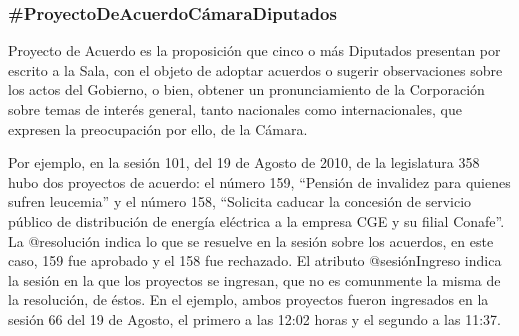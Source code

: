 \subsubsection{\#ProyectoDeAcuerdoCámaraDiputados}

Proyecto de Acuerdo es la proposición que cinco o más Diputados
presentan por escrito a la Sala, con el objeto de adoptar acuerdos o
sugerir observaciones sobre los actos del Gobierno, o bien, obtener un
pronunciamiento de la Corporación sobre temas de interés general,
tanto nacionales como internacionales, que expresen la preocupación
por ello, de la Cámara.

Por ejemplo, en la sesión 101, del 19 de Agosto de 2010, de la
legislatura 358 hubo dos proyectos de acuerdo:
el número 159, ``Pensión de invalidez para quienes sufren leucemia'' y
el número 158, ``Solicita caducar la concesión de servicio público de
distribución de energía eléctrica a la empresa CGE y su filial
Conafe''. La @resolución indica lo que se resuelve en la sesión sobre
los acuerdos, en este caso, 159 fue aprobado y el 158 fue
rechazado. El atributo @sesiónIngreso indica la sesión en la que los
proyectos se ingresan, que no es comunmente la misma de la resolución,
de éstos. En el ejemplo, ambos proyectos fueron ingresados en la
sesión 66 del 19 de Agosto, el primero a las 12:02 horas y el segundo
a las 11:37.

\begin{description}
  
\end{description}